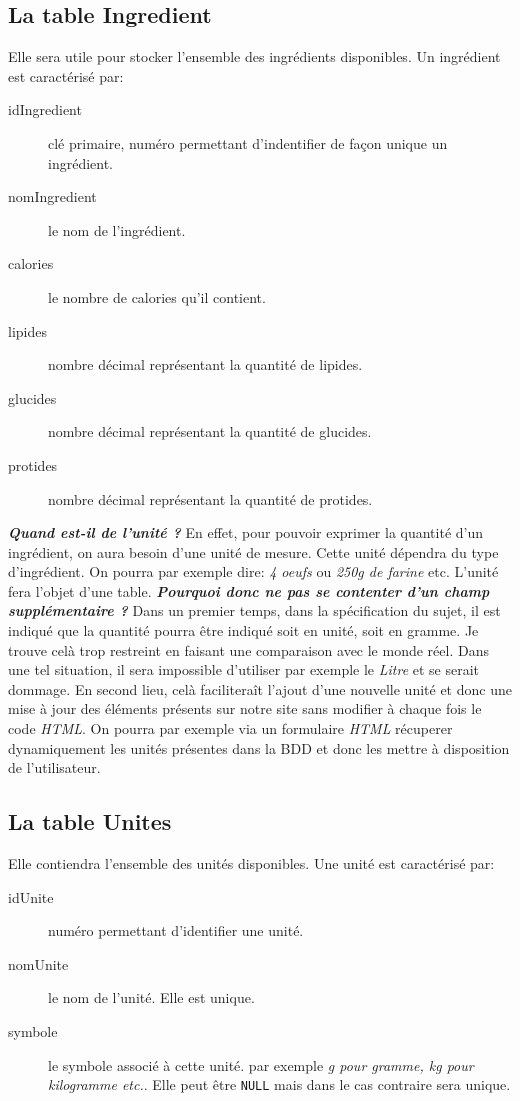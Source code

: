 \subsection{La table Ingredient}
Elle sera utile pour stocker l'ensemble des ingrédients disponibles. Un ingrédient est caractérisé par:
\begin{description}
    \item[idIngredient] clé primaire, numéro permettant d'indentifier de façon unique un ingrédient.
    \item[nomIngredient] le nom de l'ingrédient.
    \item[calories] le nombre de calories qu'il contient.
    \item[lipides] nombre décimal représentant la quantité de lipides.
    \item[glucides] nombre décimal représentant la quantité de glucides.
    \item[protides] nombre décimal représentant la quantité de protides.
\end{description}
\textbf{\textit{Quand est-il de l'unité ?}}
\newline
En effet, pour pouvoir exprimer la quantité d'un ingrédient, on aura besoin d'une unité de mesure. Cette unité dépendra du type d'ingrédient. On pourra par exemple dire: \textit{4 oeufs} ou \textit{250g de farine} etc. L'unité fera l'objet d'une table.
\newline
\textbf{\textit{Pourquoi donc ne pas se contenter d'un champ supplémentaire ?}}
\newline
Dans un premier temps, dans la spécification du sujet, il est indiqué que la quantité pourra être indiqué soit en unité, soit en gramme. Je trouve celà trop restreint en faisant une comparaison avec le monde réel. Dans une tel situation, il sera impossible d'utiliser par exemple le \textit{Litre} et se serait dommage.
\newline
En second lieu, celà faciliteraît l'ajout d'une nouvelle unité et donc une mise à jour des éléments présents sur notre site sans modifier à chaque fois le code \textit{HTML}. On pourra par exemple via un formulaire \textit{HTML} récuperer dynamiquement les unités présentes dans la BDD et donc les mettre à disposition de l'utilisateur.

\subsection{La table Unites}
Elle contiendra l'ensemble des unités disponibles. Une unité est caractérisé par:
\begin{description}
    \item[idUnite] numéro permettant d'identifier une unité.
    \item[nomUnite] le nom de l'unité. Elle est unique.
    \item[symbole] le symbole associé à cette unité. par exemple \textit{g pour gramme, kg pour kilogramme etc.}. Elle peut être \texttt{NULL} mais dans le cas contraire sera unique.
\end{description}

